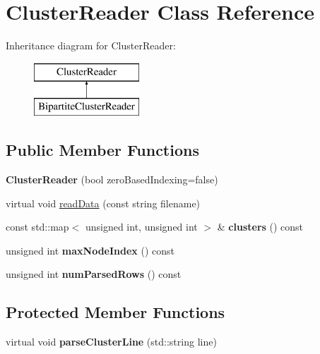 \hypertarget{classClusterReader}{}\section{Cluster\+Reader Class Reference}
\label{classClusterReader}
Inheritance diagram for Cluster\+Reader\+:\begin{figure}[H]
\begin{center}
\leavevmode
\includegraphics[height=2.000000cm]{classClusterReader}
\end{center}
\end{figure}
\subsection*{Public Member Functions}
\begin{DoxyCompactItemize}
\item 
\mbox{\label{classClusterReader_a44f678eff0e5174ebda5356413d78a09}} 
{\bfseries Cluster\+Reader} (bool zero\+Based\+Indexing=false)
\item 
virtual void \mbox{\hyperlink{classClusterReader_a45764db9840cc4f9eb97a6cab5de9823}{read\+Data}} (const string filename)
\item 
\mbox{\label{classClusterReader_a2596c175cf76870e77f8f432b98ab381}} 
const std\+::map$<$ unsigned int, unsigned int $>$ \& {\bfseries clusters} () const
\item 
\mbox{\label{classClusterReader_aa72fab6ea23389c0e7176e9ae28d8b82}} 
unsigned int {\bfseries max\+Node\+Index} () const
\item 
\mbox{\label{classClusterReader_a2471a3dadf58b9b93d55f0b6def396af}} 
unsigned int {\bfseries num\+Parsed\+Rows} () const
\end{DoxyCompactItemize}
\subsection*{Protected Member Functions}
\begin{DoxyCompactItemize}
\item 
\mbox{\label{classClusterReader_a5f5a7ae353aaec3778a5443bd8345bcc}} 
virtual void {\bfseries parse\+Cluster\+Line} (std\+::string line)
\end{DoxyCompactItemize}

